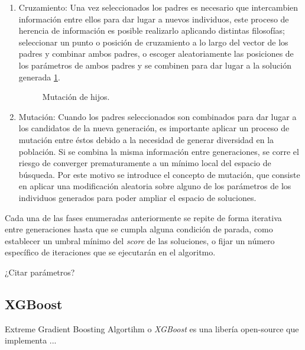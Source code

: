 \begin{enumerate}
                \item Cruzamiento:
                        Una vez seleccionados los padres es necesario que intercambien información entre ellos para dar lugar a nuevos individuos, este proceso de herencia de información es posible realizarlo aplicando distintas filosofías; seleccionar un punto o posición de cruzamiento a lo largo del vector de los padres y combinar ambos padres, o escoger aleatoriamente las posiciones de los parámetros de ambos padres y se combinen para dar lugar a la solución generada \ref{ParentsMatingMutation}.

                        \begin{figure}[h]
                            \centering
                            
                            \caption{Mutación de hijos.}
                            \label{ParentsMatingMutation}
                        \end{figure}

                \item Mutación:
                        Cuando los padres seleccionados son combinados para dar lugar a los candidatos de la nueva generación, es importante aplicar un proceso de mutación entre éstos debido a la necesidad de generar diversidad en la población. Si se combina la misma información entre generaciones, se corre el riesgo de converger prematuramente a un mínimo local del espacio de búsqueda. Por este motivo se introduce el concepto de mutación, que consiste en aplicar una modificación aleatoria sobre alguno de los parámetros de los individuos generados para poder ampliar el espacio de soluciones. 
            \end{enumerate}

            Cada una de las fases enumeradas anteriormente se repite de forma iterativa entre generaciones hasta que se cumpla alguna condición de parada, como establecer un umbral mínimo del \textit{score} de las soluciones, o fijar un número específico de iteraciones que se ejecutarán en el algoritmo.


            ¿Citar parámetros?


        \subsection {XGBoost}

            
            Extreme Gradient Boosting Algortihm o \textit{XGBoost} \citep{XGBoostTutorial} \cite{Hubel1968} es una libería open-source que implementa ...

